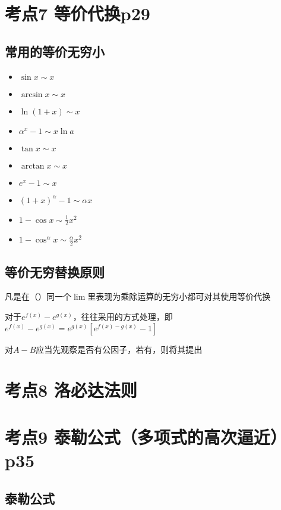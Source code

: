 \section{考点7 等价代换p29}

\subsection{常用的等价无穷小}

\begin{multicols}{4}
\begin{itemize}
    \item $ \sin x\sim x $
    \item $ \arcsin x\sim x $
    \item $ \ln (1+x)\sim x $
    \item $ \alpha^{x}-1\sim x\ln a $
    \item $ \tan x\sim x $
    \item $ \arctan x\sim x $
    \item $ e^{x}-1\sim x $
    \item $ (1+x)^{\alpha}-1\sim \alpha x $
    \item $ 1-\cos x\sim \frac{1}{2}x^{2} $
    \item $ 1-\cos^{\alpha} x\sim \frac{\alpha}{2}x^{2} $
    \end{itemize}
\end{multicols}

\subsection{等价无穷替换原则}

凡是在（）同一个$\lim$里表现为乘除运算的无穷小都可对其使用等价代换

对于$e^{f(x)}-e^{g(x)}$，往往采用的方式处理，即$e^{f(x)}-e^{g(x)}=e^{g(x)}[e^{f(x)-g(x)}-1]$

对$A-B$应当先观察是否有公因子，若有，则将其提出

\section{考点8 洛必达法则}

\section{考点9 泰勒公式（多项式的高次逼近）p35}

\subsection{泰勒公式}
